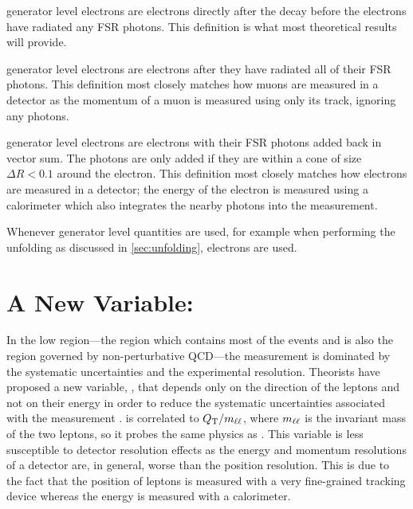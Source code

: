 \Born generator level electrons are electrons directly after the \Ztoee decay
before the electrons have radiated any FSR photons. This definition is what
most theoretical results will provide.

\Bare generator level electrons are \born electrons after they have radiated all
of their FSR photons. This definition most closely matches how muons are
measured in a detector as the momentum of a muon is measured using only its
track, ignoring any photons.

\Dressed generator level electrons are \bare electrons with their FSR photons
added back in vector sum. The photons are only added if they are within a cone
of size $\Delta R < 0.1$ around the electron. This definition most closely
matches how electrons are measured in a detector; the energy of the electron is
measured using a calorimeter which also integrates the nearby photons into the
measurement.

Whenever generator level quantities are used, for example when performing the
unfolding as discussed in \cref{sec:unfolding}, \dressed electrons are
used.


\section{A New Variable: \texorpdfstring{\phistar}{Phistar}}

In the low \bosonpt region---the region which contains most of the \Z events
and is also the region governed by non-perturbative QCD---the measurement is
dominated by the systematic uncertainties and the experimental resolution.
Theorists have proposed a new variable, \phistar, that depends only on the
direction of the leptons and not on their energy in order to reduce the
systematic uncertainties associated with the measurement \cite{banfi_2011}.
\phistar is correlated to $Q_{\mathrm{T}} / m_{\ell\ell}$, where $m_{\ell\ell}$ is the invariant mass
of the two leptons, so it probes the same physics as \bosonpt. This variable is
less susceptible to detector resolution effects as the energy and momentum
resolutions of a detector are, in general, worse than the position resolution.
This is due to the fact that the position of leptons is measured with a very
fine-grained tracking device whereas the energy is measured with a calorimeter.

